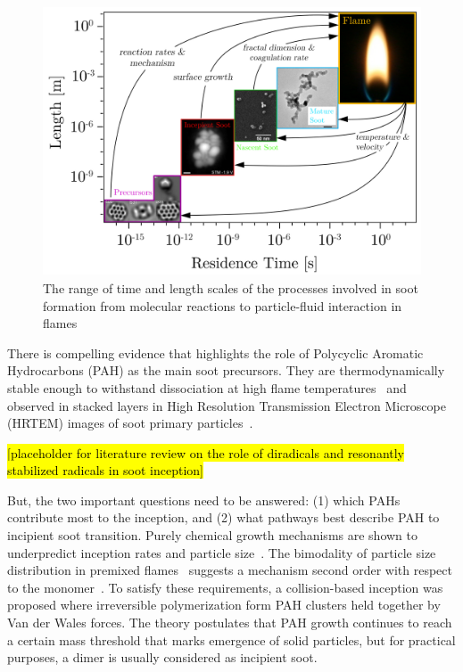 \begin{figure}[!htbp]
	\centering
	\includegraphics[height=80mm, ]{Figures/Introduction/schematics.jpg}
	\caption{The range of time and length scales of the processes involved in soot formation from molecular reactions to particle-fluid interaction in flames}
\end{figure}

There is compelling evidence that highlights the role of Polycyclic Aromatic Hydrocarbons (PAH) as the main soot precursors. They are thermodynamically stable enough to withstand dissociation at high flame temperatures~\citep{stein1985high} and observed in stacked layers in High Resolution Transmission Electron Microscope (HRTEM) images of soot primary particles~\citep{Oberlin1984}. 

\hl{[placeholder for literature review on the role of diradicals and resonantly stabilized radicals in soot inception]}

But, the two important questions need to be answered: (1) which PAHs contribute most to the inception, and (2) what pathways best describe PAH to incipient soot transition. Purely chemical growth mechanisms are shown to underpredict inception rates and particle size~\citep{frenklach2002reaction}. The bimodality of particle size distribution in premixed flames~\citep{camacho2015mobility} suggests a mechanism second order with respect to the monomer~\citep{Wang2011}. To satisfy these requirements, a collision-based inception was proposed where irreversible polymerization form PAH clusters held together by Van der Wales forces. The theory postulates that PAH growth continues to reach a certain mass threshold that marks emergence of solid particles, but for practical purposes, a dimer is usually considered as incipient soot. 


